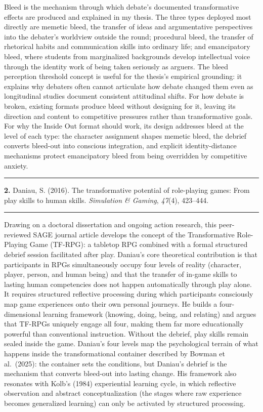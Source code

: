 \documentclass[11pt, a4paper]{article}
\newcommand{\entry}[3]{%
  \vspace{1.8em}
  {\color{rulegray}\rule{\linewidth}{0.4pt}}
  \vspace{0.5em}

  \noindent
  {\large\bfseries\color{accent}#1.}\enspace
  {\normalsize #2}%
  \enspace{\small\scshape\color{taggray}[#3]}

  \vspace{0.35em}
  {\color{accent}\rule{\linewidth}{1.2pt}}
  \vspace{0.2em}
}
\begin{document}
Bleed is the mechanism through which debate's documented transformative effects
are produced and explained in my thesis. The three types deployed most directly
are memetic bleed, the transfer of ideas and argumentative perspectives into the
debater's worldview outside the round; procedural bleed, the transfer of
rhetorical habits and communication skills into ordinary life; and emancipatory
bleed, where students from marginalized backgrounds develop intellectual voice
through the identity work of being taken seriously as arguers. The bleed
perception threshold concept is useful for the thesis's empirical grounding:
it explains why debaters often cannot articulate how debate changed them even
as longitudinal studies document consistent attitudinal shifts. For how debate
is broken, existing formats produce bleed without designing for it, leaving its
direction and content to competitive pressures rather than transformative goals.
For why the Inside Out format should work, its design addresses bleed at the
level of each type: the character assignment shapes memetic bleed, the debrief
converts bleed-out into conscious integration, and explicit identity-distance
mechanisms protect emancipatory bleed from being overridden by competitive
anxiety.

\entry{2}{Daniau, S. (2016). The transformative potential of role-playing games:
From play skills to human skills. \textit{Simulation \& Gaming}, \textit{47}(4), 423--444.}{Theoretical Framework}

Drawing on a doctoral dissertation and ongoing action research, this
peer-reviewed SAGE journal article develops the concept of the Transformative
Role-Playing Game (TF-RPG): a tabletop RPG combined with a formal structured
debrief session facilitated after play. Daniau's core theoretical contribution
is that participants in RPGs simultaneously occupy four levels of reality
(character, player, person, and human being) and that the transfer of in-game
skills to lasting human competencies does not happen automatically through play
alone. It requires structured reflective processing during which participants
consciously map game experiences onto their own personal journeys. He builds a
four-dimensional learning framework (knowing, doing, being, and relating)
and argues that TF-RPGs uniquely engage all four, making them far more
educationally powerful than conventional instruction. Without the debrief, play
skills remain sealed inside the game. Daniau's four levels map the psychological
terrain of what happens inside the transformational container described by
Bowman et al.\ (2025): the container sets the conditions, but Daniau's debrief
is the mechanism that converts bleed-out into lasting change. His framework also
resonates with Kolb's (1984) experiential learning cycle, in which reflective
observation and abstract conceptualization (the stages where raw experience
becomes generalized learning) can only be activated by structured processing.
\end{document}
